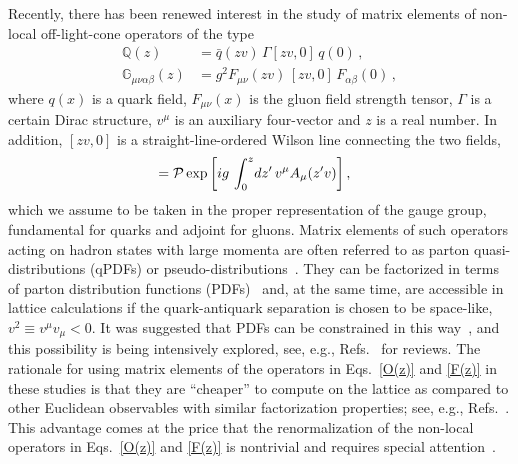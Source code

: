 \documentclass[12pt]{article}
\numberwithin{equation}{section}
\newcommand{\1}[1]{\mathbf{1}^{#1}}
\newcommand{\2}[1]{\mathbf{2}^{#1}}
\newcommand{\3}[1]{\mathbf{3}^{#1}}
\newcommand{\4}[1]{\mathbf{4}^{#1}}
\newcommand{\5}[1]{\mathbf{5}^{#1}}
\newcommand{\mlabel}[1]{ \text{\footnotesize \hspace{3mm}\fbox{\fbox{$#1$}} \label{#1}}}
\renewcommand{\mlabel}[1]{\label{#1}}
\newcommand{\vv}{v^2}
\newcommand{\Q}{\mathbb{Q}}
\newcommand{\F}{\mathbb{G}}
\begin{document}
Recently, there has been renewed interest in the study of matrix elements of non-local off-light-cone 
operators of the type
\begin{align}
 \Q(z) &= \bar{q}(z v) \,\Gamma [zv,0] \, q(0)\,, 
\mlabel{O(z)}
\\
 \F_{\mu\nu\alpha\beta}(z) &=  g^2 F_{\mu\nu}(z v) \,[zv,0] \, F_{\alpha\beta}(0)\,, 
\mlabel{F(z)}
\end{align}
where $q(x)$ is a quark field, $F_{\mu\nu}(x)$ is the gluon field strength tensor, $\Gamma$ is a certain Dirac structure, 
$v^\mu$ is an auxiliary four-vector and $z$ is a real number.
In addition, $[zv,0]$ is a straight-line-ordered Wilson line connecting the two fields,
\begin{align}
 [zv,0] &=  {\cal P} \exp \left[
    ig\, \int_0^z \! d z^\prime\, v^\mu A_{\mu}(z^\prime  v ) \right], 
\mlabel{wline}
\end{align}
which we assume to be taken in the proper representation of the gauge group,
fundamental for quarks and adjoint for gluons.  
Matrix elements of such operators acting on hadron states with large momenta are often referred to as 
parton quasi-distributions (qPDFs) \cite{Ji:2013dva} or pseudo-distributions~\cite{Radyushkin:2017cyf}.  
They can be factorized in terms of parton distribution functions (PDFs)~\cite{Izubuchi:2018srq} 
and, at the same time, are accessible in lattice calculations if the quark-antiquark separation 
is chosen to be space-like,  $ \vv \equiv v^\mu v_\mu <0 $. 
It was suggested that PDFs can be constrained in this way~\cite{Ji:2013dva}, and this possibility 
is being intensively explored, see, e.g., Refs.~\cite{Lin:2017snn,Cichy:2018mum} for reviews.    
The rationale for using matrix elements of the operators in Eqs.~\eqref{O(z)}
and \eqref{F(z)} in these studies is that 
they are ``cheaper'' to compute on the lattice as compared to other Euclidean observables with similar 
factorization properties; see, e.g., Refs.~\cite{Detmold:2005gg,Braun:2007wv,Ma:2017pxb}. This 
advantage comes at the price that the renormalization of the non-local operators in Eqs.~\eqref{O(z)} and \eqref{F(z)} is 
nontrivial and requires special 
attention~\cite{Xiong:2013bka,Ji:2015jwa,Ji:2017oey,Ishikawa:2017faj,Wang:2017eel,Wang:2017qyg,Izubuchi:2018srq,Zhang:2018diq,Wang:2019tgg,Balitsky:2019krf}.
\end{document}
